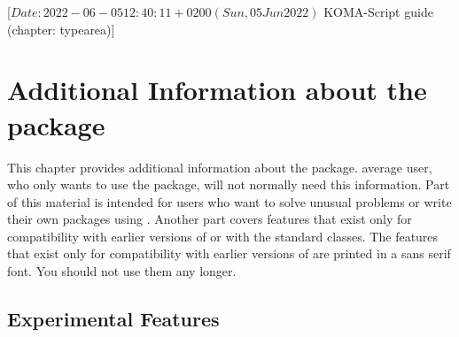 %
%
%
%
%
%
%

                 [$Date: 2022-06-05 12:40:11 +0200 (Sun, 05 Jun 2022) $
                  KOMA-Script guide (chapter: typearea)]

\chapter{Additional Information about the  package}
\BeginIndexGroup
{}

This chapter provides additional information about the 
package.  average user, who only wants to use the package, will not
normally need this information. Part of this material is intended for users
who want to solve unusual problems or write their own packages using
. Another part covers  features that exist
only for compatibility with earlier versions of \KOMAScript{} or with the
standard classes. The features that exist only for compatibility with earlier
versions of \KOMAScript{} are printed in a sans serif font. You should not use
them any longer.


\section{Experimental Features}

